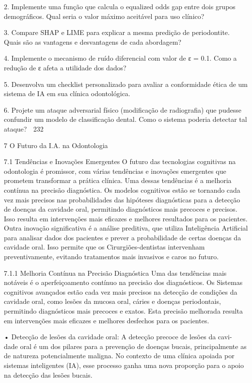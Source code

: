   2. Implemente uma função que calcula o equalized odds gap entre dois grupos
     demográficos. Qual seria o valor máximo aceitável para uso clínico?

  3. Compare SHAP e LIME para explicar a mesma predição de periodontite. Quais
     são as vantagens e desvantagens de cada abordagem?

  4. Implemente o mecanismo de ruído diferencial com valor de ε = 0.1. Como a
     redução de ε afeta a utilidade dos dados?

  5. Desenvolva um checklist personalizado para avaliar a conformidade ética de um
     sistema de IA em sua clínica odontológica.

  6. Projete um ataque adversarial físico (modificação de radiografia) que pudesse
     confundir um modelo de classificação dental. Como o sistema poderia detectar
     tal ataque?
                                                                                           232



7 O Futuro da I.A. na Odontologia

7.1     Tendências e Inovações Emergentes
O futuro das tecnologias cognitivas na odontologia é promissor, com várias tendências
e inovações emergentes que prometem transformar a prática clínica. Uma dessas
tendências é a melhoria contínua na precisão diagnóstica. Os modelos cognitivos estão
se tornando cada vez mais precisos nas probabilidades das hipóteses diagnósticas
para a detecção de doenças da cavidade oral, permitindo diagnósticos mais precoces
e precisos. Isso resulta em intervenções mais eficazes e melhores resultados para os
pacientes.
        Outra inovação significativa é a análise preditiva, que utiliza Inteligência Artificial
para analisar dados dos pacientes e prever a probabilidade de certas doenças da
cavidade oral. Isso permite que os Cirurgiões-dentistas intervenham preventivamente,
evitando tratamentos mais invasivos e caros no futuro.

7.1.1    Melhoria Contínua na Precisão Diagnóstica
Uma das tendências mais notáveis é o aperfeiçoamento contínuo na precisão dos
diagnósticos. Os Sistemas cognitivos avançados estão cada vez mais precisos na
detecção de condições da cavidade oral, como lesões da mucosa oral, cáries e doenças
periodontais, permitindo diagnósticos mais precoces e exatos. Esta precisão melhorada
resulta em intervenções mais eficazes e melhores desfechos para os pacientes.

    • Detecção de lesões da cavidade oral: A detecção precoce de lesões da cavi-
      dade oral é um dos pilares para a prevenção de doenças bucais, principalmente
      as de natureza potencialmente maligna. No contexto de uma clínica apoiada por
      sistemas inteligentes (IA), esse processo ganha uma nova proporção para o apoio
      na detecção das lesões bucais.

